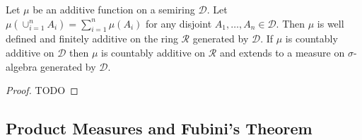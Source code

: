 \begin{lem}Let $\mu$ be an additive function on a semiring $\mathcal{D}$.  Let
  $\mu(\cup_{i=1}^n A_i) = \sum_{i=1}^n \mu(A_i)$ for any disjoint
  $A_1, \dotsc, A_n \in \mathcal{D}$.  Then $\mu$ is well defined and
  finitely additive on
  the ring $\mathcal{R}$ generated by $\mathcal{D}$.  If $\mu$ is
  countably additive on $\mathcal{D}$ then $\mu$ is countably additive
  on $\mathcal{R}$ and extends to a measure on $\sigma$-algebra
  generated by $\mathcal{D}$.
\end{lem}
\begin{proof}
TODO
\end{proof}

\subsection{Product Measures and Fubini's Theorem}


